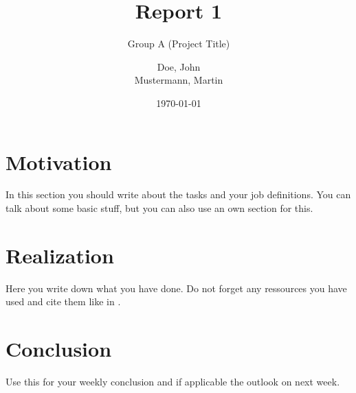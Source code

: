 \documentclass{scrartcl}
\begin{document}
\subject{Weekly Report of OOP-Project SS17---Biemann}
\title{Report 1}%
\subtitle{Group A (Project Title)}
\author{Doe, John\\Mustermann, Martin}%
\date{\today}
\maketitle


\section{Motivation}
In this section you should write about the tasks and your job definitions.
You can talk about some basic stuff, but you can also use an own section for this.

\section{Realization}
Here you write down what you have done.
Do not forget any ressources you have used and cite them like in \cite{example:url}.


\section{Conclusion}
Use this for your weekly conclusion and if applicable the outlook on next week.


\printbibliography

\end{document}
